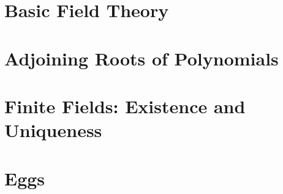 \documentclass{../../notes_d}
\author{Colton Grainger}
\date{\today}
\begin{document}
\frontstuff

\section{Basic Field Theory}
	
\section{Adjoining Roots of Polynomials}
	
\section{Finite Fields: Existence and Uniqueness}

\section{Eggs}
	
\end{document}
